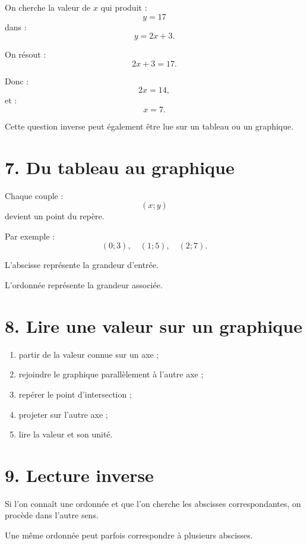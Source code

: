 On cherche la valeur de $x$ qui produit :
\[
y=17
\]
dans :
\[
y=2x+3.
\]

On résout :
\[
2x+3=17.
\]

Donc :
\[
2x=14,
\]
et :
\[
x=7.
\]

Cette question inverse peut également être lue sur un tableau ou un graphique.

\section{7. Du tableau au graphique}

Chaque couple :
\[
(x;y)
\]
devient un point du repère.

Par exemple :
\[
(0;3),\quad(1;5),\quad(2;7).
\]

L'abscisse représente la grandeur d'entrée.

L'ordonnée représente la grandeur associée.

\section{8. Lire une valeur sur un graphique}


\begin{methode}
\begin{enumerate}
\item partir de la valeur connue sur un axe ;
\item rejoindre le graphique parallèlement à l'autre axe ;
\item repérer le point d'intersection ;
\item projeter sur l'autre axe ;
\item lire la valeur et son unité.
\end{enumerate}
\end{methode}

\section{9. Lecture inverse}

Si l'on connaît une ordonnée et que l'on cherche les abscisses correspondantes, on procède dans l'autre sens.

Une même ordonnée peut parfois correspondre à plusieurs abscisses.

